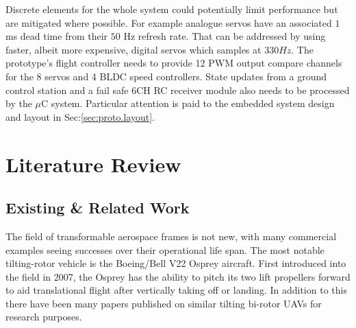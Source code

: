 \par
Discrete elements for the whole system could potentially limit performance but are mitigated where possible. For example analogue servos have an associated $1$ ms dead time from their $50$ Hz refresh rate. That can be addressed by using faster, albeit more expensive, digital servos which samples at $330 Hz$. The prototype's flight controller needs to provide 12 PWM output compare channels for the 8 servos and 4 BLDC speed controllers. State updates from a ground control station and a fail safe 6CH RC receiver module also needs to be processed by the $\mu$C system. Particular attention is paid to the embedded system design and layout in Sec:\ref{sec:proto.layout}.%
\section{Literature Review}
\label{sec:intro.litreview}
\subsection{Existing \& Related Work}
\label{subsec:intro.lit.related}
The field of transformable aerospace frames is not new, with many commercial examples seeing successes over their operational life span. The most notable tilting-rotor vehicle is the Boeing/Bell V22 Osprey\cite{osprey} aircraft. First introduced into the field in 2007, the Osprey has the ability to pitch its two lift propellers forward to aid translational flight after vertically taking off or landing. In addition to this there have been many papers published on similar tilting bi-rotor UAVs for research purposes.
